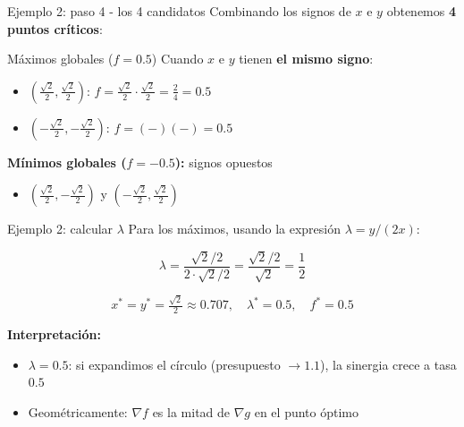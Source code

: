 \documentclass{beamer}
\begin{document}
\begin{frame}{Ejemplo 2: paso 4 - los 4 candidatos}
    \small
    Combinando los signos de $x$ e $y$ obtenemos \textbf{4 puntos críticos}:

    \vspace{0.5em}

    \begin{alertblock}{Máximos globales ($f = 0.5$)}
        Cuando $x$ e $y$ tienen \textbf{el mismo signo}:
        \begin{itemize}
            \item $\left(\frac{\sqrt{2}}{2}, \frac{\sqrt{2}}{2}\right)$: $f = \frac{\sqrt{2}}{2} \cdot \frac{\sqrt{2}}{2} = \frac{2}{4} = 0.5$
            \item $\left(-\frac{\sqrt{2}}{2}, -\frac{\sqrt{2}}{2}\right)$: $f = (-)(-)= 0.5$
        \end{itemize}
    \end{alertblock}

    \vspace{0.3em}

    \textbf{Mínimos globales ($f = -0.5$):} signos opuestos
    \begin{itemize}
        \item $\left(\frac{\sqrt{2}}{2}, -\frac{\sqrt{2}}{2}\right)$ y $\left(-\frac{\sqrt{2}}{2}, \frac{\sqrt{2}}{2}\right)$
    \end{itemize}
\end{frame}

\begin{frame}{Ejemplo 2: calcular $\lambda$}
    \small
    Para los máximos, usando la expresión $\lambda = y / (2x)$:

    \[
    \lambda = \frac{\sqrt{2}/2}{2 \cdot \sqrt{2}/2} = \frac{\sqrt{2}/2}{\sqrt{2}} = \frac{1}{2}
    \]

    \vspace{0.8em}

    \[
    \boxed{x^* = y^* = \tfrac{\sqrt{2}}{2} \approx 0.707, \quad \lambda^* = 0.5, \quad f^* = 0.5}
    \]

    \vspace{0.5em}

    \textbf{Interpretación:}
    \begin{itemize}
        \item $\lambda = 0.5$: si expandimos el círculo (presupuesto $\to 1.1$), la sinergia crece a tasa $0.5$
        \item Geométricamente: $\nabla f$ es la mitad de $\nabla g$ en el punto óptimo
    \end{itemize}
\end{frame}
\end{document}
